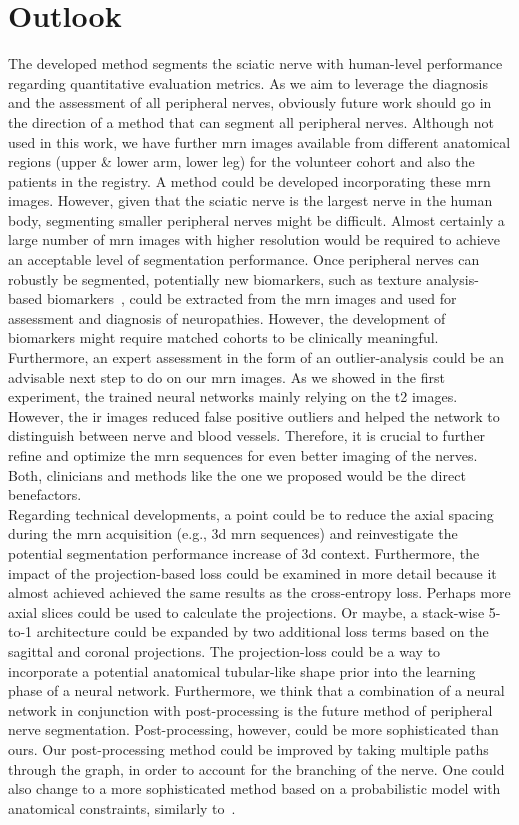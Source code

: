 \chapter{Outlook} \label{chap:outlook}
The developed method segments the sciatic nerve with human-level performance regarding quantitative evaluation metrics. As we aim to leverage the diagnosis and the assessment of all peripheral nerves, obviously future work should go in the direction of a method that can segment all peripheral nerves. Although not used in this work, we have further \gls{mrn} images available from different anatomical regions (upper \& lower arm, lower leg) for the volunteer cohort and also the patients in the registry. A method could be developed incorporating these \gls{mrn} images. However, given that the sciatic nerve is the largest nerve in the human body, segmenting smaller peripheral nerves might be difficult. Almost certainly a large number of \gls{mrn} images with higher resolution would be required to achieve an acceptable level of segmentation performance. Once peripheral nerves can robustly be segmented, potentially new biomarkers, such as texture analysis-based biomarkers~\cite{FelisazTextureNeuropathy}, could be extracted from the \gls{mrn} images and used for assessment and diagnosis of neuropathies. However, the development of biomarkers might require matched cohorts to be clinically meaningful. Furthermore, an expert assessment in the form of an outlier-analysis could be an advisable next step to do on our \gls{mrn} images. As we showed in the first experiment, the trained neural networks mainly relying on the \gls{t2} images. However, the \gls{ir} images reduced false positive outliers and helped the network to distinguish between nerve and blood vessels. Therefore, it is crucial to further refine and optimize the \gls{mrn} sequences for even better imaging of the nerves. Both, clinicians and methods like the one we proposed would be the direct benefactors.\\
Regarding technical developments, a point could be to reduce the axial spacing during the \gls{mrn} acquisition (e.g., \gls{3d} \gls{mrn} sequences) and reinvestigate the potential segmentation performance increase of \gls{3d} context.
Furthermore, the impact of the projection-based loss could be examined in more detail because it almost achieved achieved the same results as the cross-entropy loss. Perhaps more axial slices could be used to calculate the projections. Or maybe, a stack-wise 5-to-1 architecture could be expanded by two additional loss terms based on the sagittal and coronal projections. The projection-loss could be a way to incorporate a potential anatomical tubular-like shape prior into the learning phase of a neural network. Furthermore, we think that a combination of a neural network in conjunction with post-processing is the future method of peripheral nerve segmentation. Post-processing, however, could be more sophisticated than ours. Our post-processing method could be improved by taking multiple paths through the graph, in order to account for the branching of the nerve. One could also change to a more sophisticated method based on a probabilistic model with anatomical constraints, similarly to~\cite{Rempfler2015ReconstructingProgramming}.
\endinput